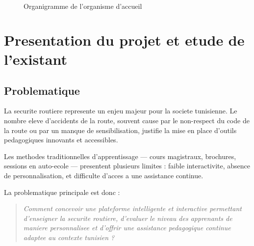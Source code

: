 \documentclass[a4paper,12pt]{report}
\begin{document}
    \begin{figure}[H]
      \centering
      \caption{Organigramme de l'organisme d'accueil}
      \label{fig:organigramme}
    \end{figure}

\section{Presentation du projet et etude de l'existant}

\subsection{Problematique}

La securite routiere represente un enjeu majeur pour la societe tunisienne.
Le nombre eleve d'accidents de la route, souvent cause par le non-respect du
code de la route ou par un manque de sensibilisation, justifie la mise en place
d'outils pedagogiques innovants et accessibles.

Les methodes traditionnelles d'apprentissage --- cours magistraux, brochures,
sessions en auto-ecole --- presentent plusieurs limites : faible interactivite,
absence de personnalisation, et difficulte d'acces a une assistance continue.

La problematique principale est donc :
\begin{quote}
\textit{Comment concevoir une plateforme intelligente et interactive permettant
d'enseigner la securite routiere, d'evaluer le niveau des apprenants de maniere
personnalisee et d'offrir une assistance pedagogique continue adaptee au contexte
tunisien ?}
\end{quote}
\end{document}
